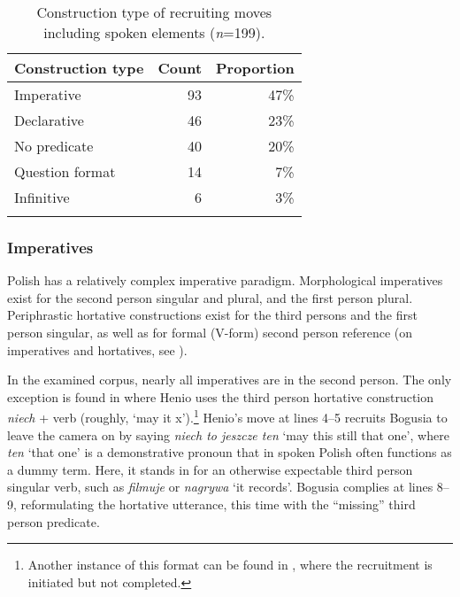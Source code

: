 \documentclass[output=paper]{langsci/langscibook}
\begin{document}
\begin{table}
\begin{tabularx}{0.66\textwidth}{Xrr}
\lsptoprule
Construction type & Count & Proportion\\
\midrule
Imperative & 93 & 47\%\\
Declarative & 46 & 23\%\\
No predicate & 40 & 20\%\\
Question format & 14 & 7\%\\
Infinitive & ~6 & 3\%\\
\lspbottomrule
\end{tabularx}
\caption{Construction type of recruiting moves including spoken elements (\textit{n}=199).}
\label{tab:zinken:2}
\end{table}

\subsubsection{Imperatives}\label{sec:zinken:3.3.1}

Polish has a relatively complex imperative paradigm.  Morphological imperatives exist for the second person singular and plural, and the first person plural.  Periphrastic hortative constructions exist for the third persons and the first person singular, as well as for formal (V-form) second person reference (on imperatives and hortatives, see \citealt{VanderAuwera2013}).  

In the examined corpus, nearly all imperatives are in the second person.  The only exception is found in  where Henio uses the third person hortative construction \textit{niech} + verb (roughly, `may it x').\footnote{Another instance of this format can be found in , where the recruitment is initiated but not completed.} Henio’s move at lines 4--5 recruits Bogusia to leave the camera on by saying \textit{niech to jeszcze ten} `may this still that one', where \textit{ten} `that one' is a demonstrative pronoun that in spoken Polish often functions as a dummy term. Here, it stands in for an otherwise expectable third person singular verb, such as \textit{filmuje} or \textit{nagrywa} `it records'.  Bogusia complies at lines 8--9, reformulating the hortative utterance, this time with the “missing” third person predicate.
\end{document}

